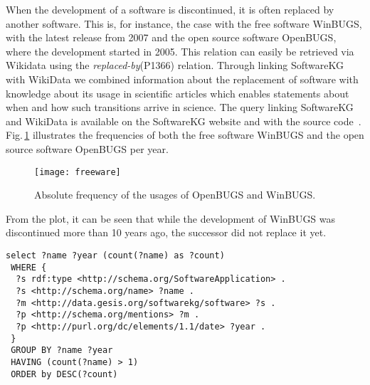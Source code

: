 \documentclass[runningheads]{llncs}
\newcommand{\figref}[1]{Fig.\,\ref{#1}}
\begin{document}
When the development of a software is discontinued, it is often replaced by another software.
This is, for instance, the case with the free software WinBUGS, with the latest release from 2007 and the open source software OpenBUGS, where the development started in 2005.
This relation can easily be retrieved via Wikidata using the \textit{replaced-by}(P1366) relation.
Through linking SoftwareKG with WikiData we combined information about the replacement of software with knowledge about its usage in scientific articles which enables statements about when and how such transitions arrive in science. 
The query linking SoftwareKG and WikiData is available on the SoftwareKG website and with the source code~\cite{Schindler_softwarekg_2020}.
\figref{fig:BUGS} illustrates the frequencies of both the free software WinBUGS and the open source software OpenBUGS per year.
\begin{figure}[tb]
    \centering
    \texttt{[image: freeware]}
    \caption{Absolute frequency of the usages of OpenBUGS and WinBUGS.}
    \label{fig:BUGS}
\end{figure}
From the plot, it can be seen that while the development of WinBUGS was discontinued more than 10 years ago, the successor did not replace it yet.

\begin{lstlisting}[float,captionpos=b, caption={SPARQL query to retrieve frequency of software mention per year}, label={lst:sparql}, basicstyle=\ttfamily,frame=single]
select ?name ?year (count(?name) as ?count) 
 WHERE { 
  ?s rdf:type <http://schema.org/SoftwareApplication> .   
  ?s <http://schema.org/name> ?name . 
  ?m <http://data.gesis.org/softwarekg/software> ?s . 
  ?p <http://schema.org/mentions> ?m . 
  ?p <http://purl.org/dc/elements/1.1/date> ?year . 
 } 
 GROUP BY ?name ?year
 HAVING (count(?name) > 1)
 ORDER by DESC(?count)
\end{lstlisting}
\end{document}
